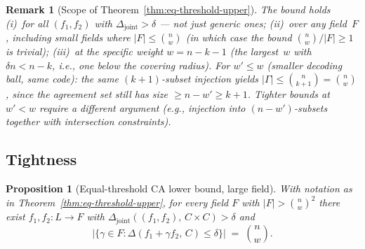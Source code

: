 \documentclass[11pt]{article}
\newtheorem{proposition}[theorem]{Proposition}
\newtheorem{remark}[theorem]{Remark}
\begin{document}
\begin{remark}[Scope of Theorem~\ref{thm:eq-threshold-upper}]
\label{rem:eq-threshold-scope}
The bound holds (i)~for \emph{all} $(f_1, f_2)$ with $\Delta_{\mathrm{joint}} > \delta$ — not just generic ones; (ii)~over \emph{any} field~$F$, including small fields where $|F| \leq \binom{n}{w}$ (in which case the bound $\binom{n}{w}/|F| \geq 1$ is trivial); (iii)~at the specific weight $w = n - k - 1$ (the largest~$w$ with $\delta n < n - k$, i.e., one below the covering radius). For $w' \leq w$ (smaller decoding ball, same code): the same $(k{+}1)$-subset injection yields $|\Gamma| \leq \binom{n}{k+1} = \binom{n}{w}$, since the agreement set still has size $\geq n - w' \geq k + 1$. Tighter bounds at $w' < w$ require a different argument (e.g., injection into $(n{-}w')$-subsets together with intersection constraints).
\end{remark}

\subsection{Tightness}

\begin{proposition}[Equal-threshold CA lower bound, large field]
\label{prop:eq-threshold-tight}
With notation as in Theorem~\ref{thm:eq-threshold-upper}, for every field $F$ with $|F| > \binom{n}{w}^2$ there exist $f_1, f_2: L \to F$ with $\Delta_{\mathrm{joint}}((f_1, f_2),\, C \times C) > \delta$ and
$$\bigl|\{\gamma \in F : \Delta(f_1 + \gamma f_2,\, C) \leq \delta\}\bigr| \;=\; \binom{n}{w}.$$
\end{proposition}
\end{document}
